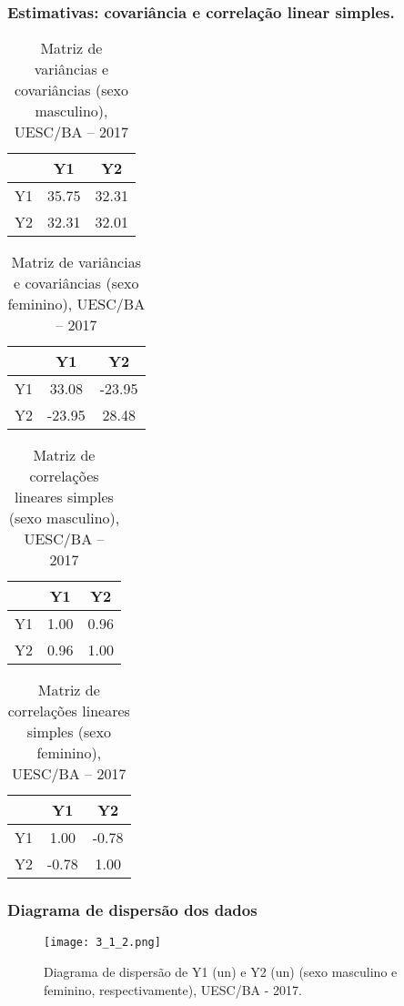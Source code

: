 \documentclass[a4paper, 10pt]{article}
\begin{document}
			\subsubsection{Estimativas: covariância e correlação linear simples.}
				\begin{table}[!htb]
					\caption{Matriz de variâncias e covariâncias (sexo masculino), UESC/BA – 2017}
					\begin{tabular}{ccc}
						\hline
						& Y1 & Y2  \\
						\hline
						Y1 & 35.75 & 32.31 \\
						Y2 & 32.31 & 32.01 \\
						\hline
					\end{tabular}
				\end{table}
				\begin{table}[!htb]
					\caption{Matriz de variâncias e covariâncias (sexo feminino), UESC/BA – 2017}
					\begin{tabular}{ccc}
						\hline
						& Y1 & Y2  \\
						\hline
						Y1 & 33.08 & -23.95 \\
						Y2 & -23.95 & 28.48 \\
						\hline
					\end{tabular}
				\end{table}
				\begin{table}[!htb]
					\caption{Matriz de correlações lineares simples (sexo masculino), UESC/BA – 2017}
					\begin{tabular}{ccc}
						\hline
						& Y1 & Y2  \\
						\hline
						Y1 & 1.00 & 0.96 \\
						Y2 & 0.96 & 1.00 \\
						\hline
					\end{tabular}
				\end{table}
				\begin{table}[!htb]
					\caption{Matriz de correlações lineares simples (sexo feminino), UESC/BA – 2017}
					\begin{tabular}{ccc}
						\hline
						& Y1 & Y2  \\
						\hline
						Y1 & 1.00 & -0.78 \\
						Y2 & -0.78 & 1.00 \\
						\hline
					\end{tabular}
				\end{table}
			\subsubsection{Diagrama de dispersão dos dados}
				\begin{figure}[!htb]
					\texttt{[image: 3\_1\_2.png]}
					\caption{Diagrama de dispersão de Y1 (un) e Y2 (un) (sexo masculino e feminino, respectivamente), UESC/BA - 2017.}
				\end{figure}
\end{document}
